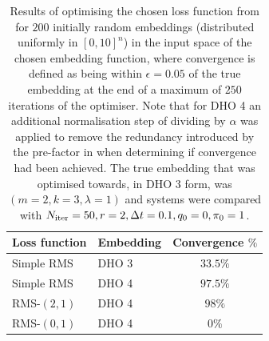\begin{table}
\label{table:optimisation-results}
\centering
\caption{Results of optimising the chosen loss function from  for $200$ initially random embeddings (distributed uniformly in $[0, 10]^n$) in the input space of the chosen embedding function, where convergence is defined as being within $\epsilon = 0.05$ of the true embedding at the end of a maximum of $250$ iterations of the optimiser. Note that for DHO 4 an additional normalisation step of dividing by $\alpha$ was applied to remove the redundancy introduced by the pre-factor in when determining if convergence had been achieved. The true embedding that was optimised towards, in DHO 3 form, was $(m = 2, k = 3, \lambda = 1)$ and systems were compared with $N_{\mathrm{iter}} = 50, r = 2, \Delta t = 0.1, q_0 = 0, \pi_0 = 1$.}
\begin{tabular}{l|l|c}
  Loss function & Embedding & Convergence $\%$ \\
  \hline
  Simple RMS & DHO 3 & $33.5\%$ \\
  Simple RMS & DHO 4 & $97.5\%$ \\
  RMS-$(2, 1)$ & DHO 4 & $98\%$ \\
  RMS-$(0, 1)$ & DHO 4 & $0\%$ \\
\end{tabular}
\end{table}
